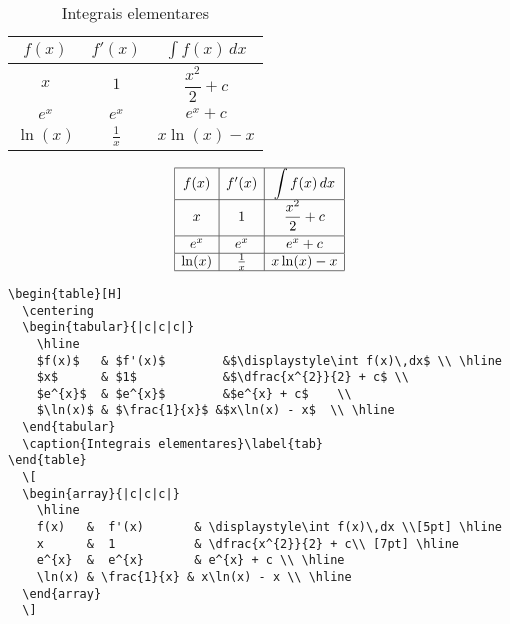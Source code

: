 \begin{tcolorbox}[title={Exemplo de inserção de tabela}]
\begin{table}[H]
  \centering
  \begin{tabular}{|c|c|c|}
    \hline
    $f(x)$   & $f'(x)$        &$\displaystyle\int f(x)\,dx$ \\ \hline
    $x$      & $1$            &$\dfrac{x^{2}}{2} + c$ \\
    $e^{x}$  & $e^{x}$        &$e^{x} + c$    \\
    $\ln(x)$ & $\frac{1}{x}$ &$x\ln(x) - x$  \\ \hline
  \end{tabular}
  \caption{Integrais elementares}\label{tab}
\end{table}
  \[
  \begin{array}{|c|c|c|}
    \hline
    f(x)   &  f'(x)       & \displaystyle\int f(x)\,dx \\[5pt] \hline
    x      &  1           & \dfrac{x^{2}}{2} + c\\ [7pt] \hline
    e^{x}  &  e^{x}       & e^{x} + c \\ \hline
    \ln(x) & \frac{1}{x} & x\ln(x) - x \\ \hline
  \end{array}
  \]
\tcblower
\begin{lstlisting}
\begin{table}[H]
  \centering
  \begin{tabular}{|c|c|c|}
    \hline
    $f(x)$   & $f'(x)$        &$\displaystyle\int f(x)\,dx$ \\ \hline
    $x$      & $1$            &$\dfrac{x^{2}}{2} + c$ \\
    $e^{x}$  & $e^{x}$        &$e^{x} + c$    \\
    $\ln(x)$ & $\frac{1}{x}$ &$x\ln(x) - x$  \\ \hline
  \end{tabular}
  \caption{Integrais elementares}\label{tab}
\end{table}
  \[
  \begin{array}{|c|c|c|}
    \hline
    f(x)   &  f'(x)       & \displaystyle\int f(x)\,dx \\[5pt] \hline
    x      &  1           & \dfrac{x^{2}}{2} + c\\ [7pt] \hline
    e^{x}  &  e^{x}       & e^{x} + c \\ \hline
    \ln(x) & \frac{1}{x} & x\ln(x) - x \\ \hline
  \end{array}
  \]
\end{lstlisting}
\end{tcolorbox}

